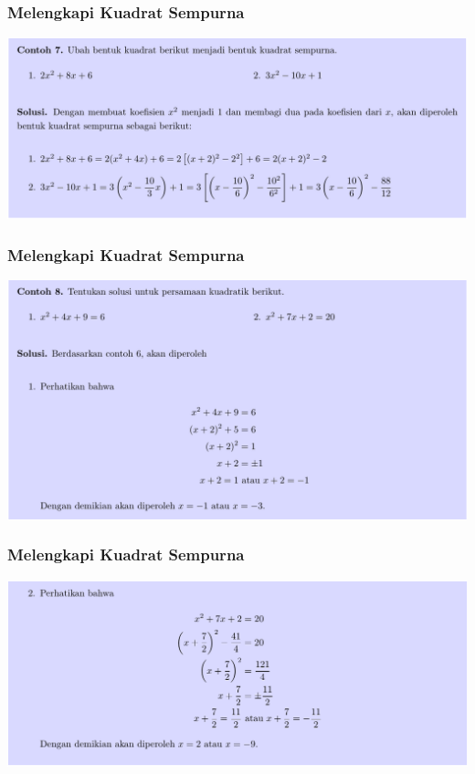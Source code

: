 \documentclass[pdflatex,compress,mathserif]{beamer}
\begin{document}
\begin{frame}
	\frametitle{Melengkapi Kuadrat Sempurna}
	\begin{center}
		\includegraphics[width=\linewidth]{img/img15}
	\end{center}
\end{frame}


\begin{frame}
	\frametitle{Melengkapi Kuadrat Sempurna}
	\begin{center}
		\includegraphics[width=\linewidth]{img/img16}
	\end{center}
\end{frame}


\begin{frame}
	\frametitle{Melengkapi Kuadrat Sempurna}
	\begin{center}
		\includegraphics[width=\linewidth]{img/img17}
	\end{center}
\end{frame}
\end{document}
